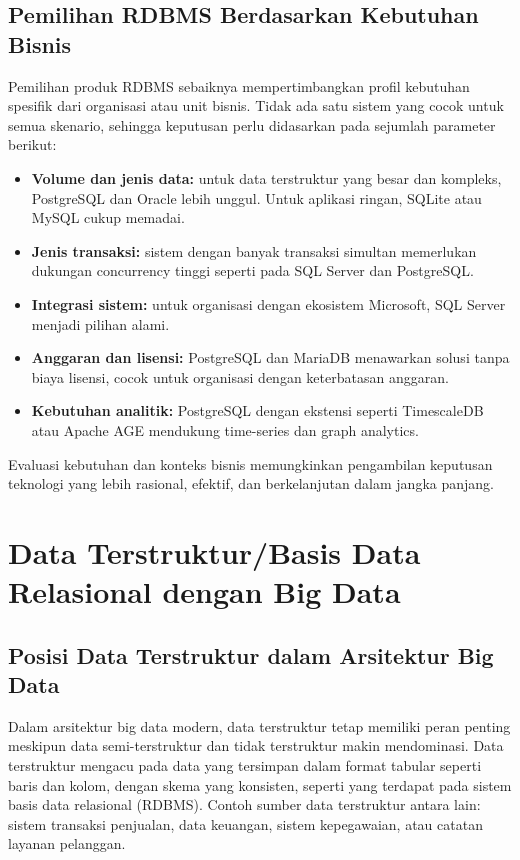 \subsection{Pemilihan RDBMS Berdasarkan Kebutuhan Bisnis}

Pemilihan produk RDBMS sebaiknya mempertimbangkan profil kebutuhan spesifik dari organisasi atau unit bisnis. Tidak ada satu sistem yang cocok untuk semua skenario, sehingga keputusan perlu didasarkan pada sejumlah parameter berikut:

\begin{itemize}
	\item \textbf{Volume dan jenis data:} untuk data terstruktur yang besar dan kompleks, PostgreSQL dan Oracle lebih unggul. Untuk aplikasi ringan, SQLite atau MySQL cukup memadai.
	\item \textbf{Jenis transaksi:} sistem dengan banyak transaksi simultan memerlukan dukungan concurrency tinggi seperti pada SQL Server dan PostgreSQL.
	\item \textbf{Integrasi sistem:} untuk organisasi dengan ekosistem Microsoft, SQL Server menjadi pilihan alami.
	\item \textbf{Anggaran dan lisensi:} PostgreSQL dan MariaDB menawarkan solusi tanpa biaya lisensi, cocok untuk organisasi dengan keterbatasan anggaran.
	\item \textbf{Kebutuhan analitik:} PostgreSQL dengan ekstensi seperti TimescaleDB atau Apache AGE mendukung time-series dan graph analytics.
\end{itemize}

Evaluasi kebutuhan dan konteks bisnis memungkinkan pengambilan keputusan teknologi yang lebih rasional, efektif, dan berkelanjutan dalam jangka panjang.

\section{Data Terstruktur/Basis Data Relasional dengan Big Data}

\subsection{Posisi Data Terstruktur dalam Arsitektur Big Data}

Dalam arsitektur big data modern, data terstruktur tetap memiliki peran penting meskipun data semi-terstruktur dan tidak terstruktur makin mendominasi. Data terstruktur mengacu pada data yang tersimpan dalam format tabular seperti baris dan kolom, dengan skema yang konsisten, seperti yang terdapat pada sistem basis data relasional (RDBMS). Contoh sumber data terstruktur antara lain: sistem transaksi penjualan, data keuangan, sistem kepegawaian, atau catatan layanan pelanggan.

